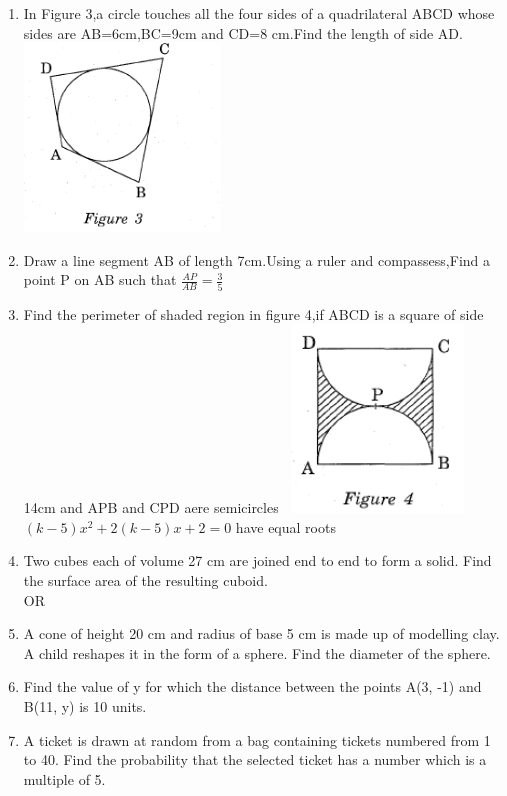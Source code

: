 \documentclass[journal,12pt,twocolumn]{IEEEtran}
\renewcommand\thesection{\arabic{section}}
\begin{document}
\begin{enumerate}[label=\thesection.\arabic*.,ref=\thesection.\theenumi]
\item In Figure 3,a circle touches all the four sides of a quadrilateral ABCD whose sides are AB=6cm,BC=9cm and CD=8 cm.Find the length of side AD.
\includegraphics[width=\columnwidth,height=5cm,center]{5.png}
\item Draw a line segment AB of length 7cm.Using a ruler and compassess,Find a point P on AB such that 
$\frac{AP}{AB}=\frac{3}{5}$
\item Find the perimeter of shaded region in figure 4,if ABCD is a square of side 14cm and APB and CPD aere semicircles
\includegraphics[width=5cm,height=5cm,center]{6.png}
$(k-5)x^2+2(k-5)x+2=0 $ have equal roots
\item Two cubes each of volume 27 cm are joined end to end to form a solid. Find the surface area of the resulting cuboid.\\
OR\\
\item A cone of height 20 cm and radius of base 5 cm is made up of modelling clay. A child reshapes it in the form of a sphere. Find the diameter of the sphere.
\item Find the value of y for which the distance between the points A(3, -1) and B(11, y) is 10 units.
\item A ticket is drawn at random from a bag containing tickets numbered from 1 to 40. Find the probability that the selected ticket has a number which is a multiple of 5.


\end{enumerate}
\end{document}

